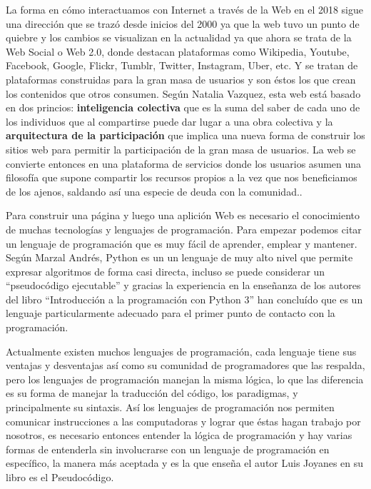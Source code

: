 \documentclass[twocolumns,a4paper]{IEEEtran}
\begin{document}
La forma en cómo interactuamos con Internet a través de la Web en el 2018
sigue una dirección que se trazó desde inicios del 2000 ya que la web tuvo un
punto de quiebre y los cambios se visualizan en la actualidad ya que ahora se
trata de la Web Social o Web 2.0, donde destacan plataformas como Wikipedia,
Youtube, Facebook, Google, Flickr, Tumblr, Twitter, Instagram, Uber, etc. Y se
tratan de plataformas construidas para la gran masa de usuarios y son éstos los
que crean los contenidos que otros consumen. Según Natalia Vazquez, esta web
está basado en dos princios: \textbf{inteligencia colectiva} que es la suma del
saber de cada uno de los individuos que al compartirse puede dar lugar a una
obra colectiva y la \textbf{arquitectura de la participación} que implica una
nueva forma de construir los sitios web para permitir la participación de la
gran masa de usuarios. La web se convierte entonces en una plataforma de
servicios donde los usuarios asumen una filosofía que supone compartir los
recursos propios a la vez que nos beneficiamos de los ajenos, saldando así una
especie de deuda con la comunidad.\cite{NataliaVazquezWeb2007}.  \newline
\newline

Para construir una página y luego una aplición Web es necesario el conocimiento
de muchas tecnologías y lenguajes de programación. Para empezar podemos citar
un lenguaje de programación que es muy fácil de aprender, emplear y mantener.
Según Marzal Andrés, Python es un un lenguaje de muy alto nivel que permite
expresar algoritmos de forma casi directa, incluso se puede considerar un
``pseudocódigo ejecutable'' y gracias la experiencia en la enseñanza de los
autores del libro ``Introducción a la programación con Python 3'' han concluído
que es un lenguaje particularmente adecuado para el primer punto de contacto
con la programación\cite{IntroPython2008}.
\newline

Actualmente existen muchos lenguajes de programación, cada lenguaje tiene sus
ventajas y desventajas así como su comunidad de programadores que las respalda,
pero los lenguajes de programación manejan la misma lógica, lo que las
diferencia es su forma de manejar la traducción del código, los paradigmas,
y principalmente su sintaxis. Así los lenguajes de
programación nos permiten comunicar instrucciones a las computadoras y lograr
que éstas hagan trabajo por nosotros, es necesario entonces entender la lógica
de programación y hay varias formas de entenderla sin involucrarse con un
lenguaje de programación en específico, la manera más aceptada y es la que
enseña el autor Luis Joyanes en su libro es el
Pseudocódigo\cite{JoyanesProg2008}.
\newline
\end{document}
